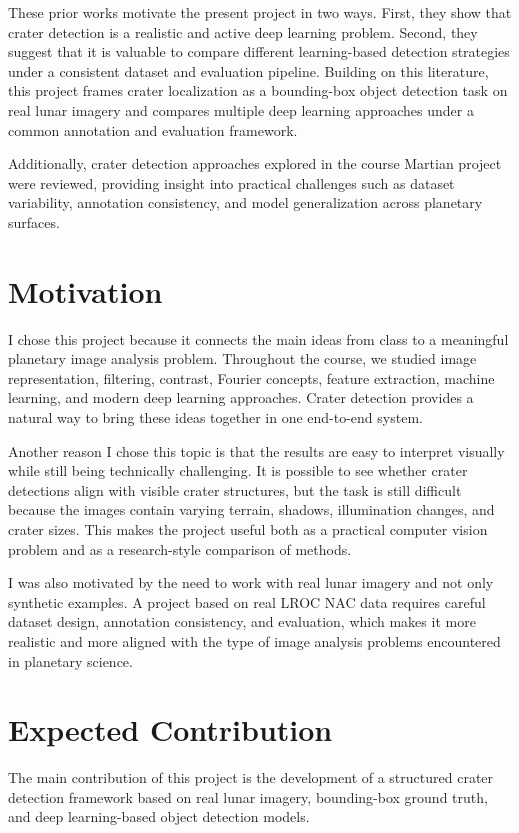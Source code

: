\documentclass[conference]{IEEEtran}
\begin{document}
	These prior works motivate the present project in two ways. First, they show that crater detection is a realistic and active deep learning problem. Second, they suggest that it is valuable to compare different learning-based detection strategies under a consistent dataset and evaluation pipeline. Building on this literature, this project frames crater localization as a bounding-box object detection task on real lunar imagery and compares multiple deep learning approaches under a common annotation and evaluation framework.
	
	Additionally, crater detection approaches explored in the course Martian project were reviewed, providing insight into practical challenges such as dataset variability, annotation consistency, and model generalization across planetary surfaces.
	
	\section{Motivation}
	I chose this project because it connects the main ideas from class to a meaningful planetary image analysis problem. Throughout the course, we studied image representation, filtering, contrast, Fourier concepts, feature extraction, machine learning, and modern deep learning approaches. Crater detection provides a natural way to bring these ideas together in one end-to-end system.
	
	Another reason I chose this topic is that the results are easy to interpret visually while still being technically challenging. It is possible to see whether crater detections align with visible crater structures, but the task is still difficult because the images contain varying terrain, shadows, illumination changes, and crater sizes. This makes the project useful both as a practical computer vision problem and as a research-style comparison of methods.
	
	I was also motivated by the need to work with real lunar imagery and not only synthetic examples. A project based on real LROC NAC data requires careful dataset design, annotation consistency, and evaluation, which makes it more realistic and more aligned with the type of image analysis problems encountered in planetary science.
	
	\section{Expected Contribution}
	The main contribution of this project is the development of a structured crater detection framework based on real lunar imagery, bounding-box ground truth, and deep learning-based object detection models.
	
\end{document}
